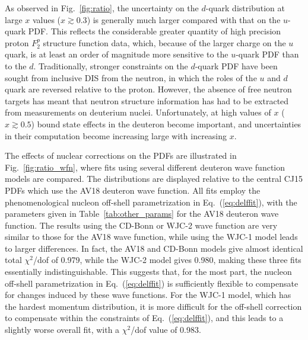 \documentclass[aps,prd,amsmath,preprint]{revtex4}
\begin{document}
As observed in Fig.~\ref{fig:ratio}, the uncertainty on the $d$-quark
distribution at large $x$ values ($x \gtrsim 0.3$) is generally much
larger compared with that on the $u$-quark PDF.
This reflects the considerable greater quantity of high precision
proton $F_2^p$ structure function data, which, because of the larger
charge on the $u$ quark, is at least an order of magnitude more
sensitive to the $u$-quark PDF than to the $d$.
Traditionally, stronger constraints on the $d$-quark PDF have been
sought from inclusive DIS from the neutron, in which the roles of
the $u$ and $d$ quark are reversed relative to the proton.  However,
the absence of free neutron targets has meant that neutron structure
information has had to be extracted from measurements on deuterium
nuclei.  Unfortunately, at high values of $x$ ($x \gtrsim 0.5$) bound
state effects in the deuteron become important, and uncertainties in
their computation become increasing large with increasing $x$.


The effects of nuclear corrections on the PDFs are illustrated in
Fig.~\ref{fig:ratio_wfn}, where fits using several different deuteron
wave function models are compared.  The distributions are displayed
relative to the central CJ15 PDFs which use the AV18 deuteron wave
function.  All fits employ the phenomenological nucleon off-shell
parametrization in Eq.~(\ref{eq:delffit}), with the parameters given
in Table~\ref{tab:other_params} for the AV18 deuteron wave function.
%
The results using the CD-Bonn or WJC-2 wave function are very
similar to those for the AV18 wave function, while using the WJC-1
model leads to larger differences.  In fact, the AV18 and CD-Bonn
models give almost identical total $\chi^2$/dof of 0.979, while
the WJC-2 model gives 0.980, making these three fits essentially
indistinguishable.  This suggests that, for the most part, the
nucleon off-shell parametrization in Eq.~(\ref{eq:delffit}) is
sufficiently flexible to compensate for changes induced by these
wave functions.  For the WJC-1 model, which has the hardest momentum
distribution, it is more difficult for the off-shell correction to
compensate within the constraints of Eq.~(\ref{eq:delffit}), and
this leads to a slightly worse overall fit, with a $\chi^2$/dof
value of 0.983.
\end{document}
